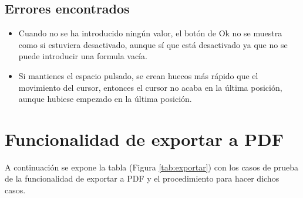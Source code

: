 \subsection{Errores encontrados}
\label{errores:mates}
\begin{itemize}
    \item Cuando no se ha introducido ningún valor, el botón de Ok no se muestra como si estuviera desactivado, aunque sí que está desactivado ya que no se puede introducir una formula vacía.
    \item Si mantienes el espacio pulsado, se crean huecos más rápido que el movimiento del cursor, entonces el cursor no acaba en la última posición, aunque hubiese empezado en la última posición.
\end{itemize}

\section{Funcionalidad de exportar a PDF}
\label{planPruebas:exportar}
A continuación se expone la tabla (Figura \ref{tab:exportar}) con los casos de prueba de la funcionalidad de exportar a PDF y el procedimiento para hacer dichos casos.

